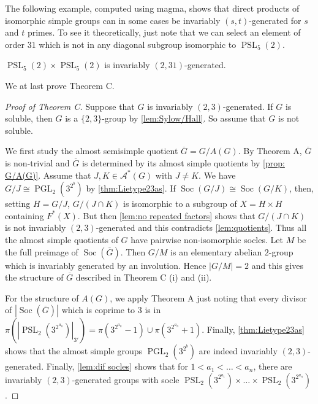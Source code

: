 \documentclass[12pt,a4paper]{amsart}
\DeclareMathOperator{\PGL}{PGL}
\DeclareMathOperator{\PSL}{PSL}
\DeclareMathOperator{\Soc}{Soc}
\newcommand{\ov}{\overline}
\begin{document}
The following example, computed using {\sc magma}, shows that direct products of isomorphic simple groups can in some cases be invariably $(s,t)$-generated for $s$ and $t$ primes. To see it theoretically, just note that we can select an element of order $31$ which is not in any diagonal subgroup isomorphic to $\PSL_5(2)$.

\begin{example} $\PSL_5(2)\times \PSL_5(2)$ is invariably $(2,31)$-generated.
\end{example}

We at last prove Theorem C.



\begin{proof}[Proof of Theorem C] Suppose that $G$ is invariably $(2,3)$-generated. If  $G$ is  soluble, then  $G$ is a $\{2,3\}$-group by \cref{lem:Sylow/Hall}. So assume that $G$ is not soluble.


We first study the almost semisimple quotient $\overline G=G/A(G)$. By Theorem A, $\ov G$ is non-trivial and $\ov G$ is determined by its almost simple quotients by \cref{prop: G/A(G)}. Assume that $J,K \in \mathcal A^*(G)$ with $J\ne K$. We have $G/J\cong \PGL_2(3^{2^b})$ by \cref{thm:Lietype23as}.
If  $\Soc(G/J)\cong \Soc(G/K)$, then, setting $H=G/J$, $G/(J\cap K)$ is isomorphic to a subgroup of $X=H \times H$ containing $F^*(X)$. But then \cref{lem:no repeated factors} shows that $G/(J\cap K)$ is not invariably $(2,3)$-generated and this contradicts \cref{lem:quotients}. Thus all the almost simple quotients of $G$ have pairwise non-isomorphic socles. Let $M$ be the full preimage of  $\Soc(\ov G)$. Then $G/M$ is an elementary abelian $2$-group which is invariably generated by an involution. Hence $|G/M|=2$ and this gives the structure of $\ov G$ described in Theorem C (i) and (ii).

 For the structure of $A(G)$, we apply Theorem A just noting that every divisor of $|\Soc(\ov G)|$ which is coprime to $3$ is   in   $\pi(|\PSL_2(3^{2^{a_n}})|_{3'})=\pi(3^{2^{a_n}}-1)\cup \pi(3^{2^{a_n}}+1)$. Finally, \cref{thm:Lietype23as}   shows that the almost simple groups $\PGL_2(3^{2^b})$ are indeed invariably $(2,3)$-generated.
 Finally,  \cref{lem:dif socles} shows that for $1  <a_1 <\dots< a_n$, there are invariably $(2,3)$-generated groups with socle $\PSL_2(3^{2^{a_1}}) \times \dots\times \PSL_2(3^{2^{a_n}})$.
\end{proof}



\printbibliography
\end{document}
